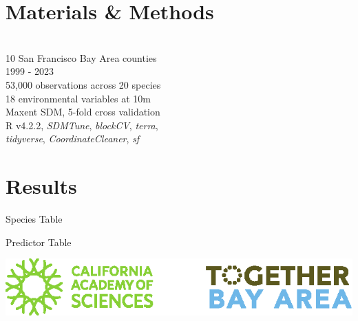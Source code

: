 \documentclass[a0paper,fleqn]{betterposter}
\begin{document}
{\section{Materials \& Methods}
\def\iconspace{3mm}
\vspace{-14mm}
\\\faMapO   \hspace{1cm} 10 San Francisco Bay Area counties
\vspace{\iconspace}
\\\faClockO \hspace{1cm} 1999 - 2023
\vspace{\iconspace}
\\\faMapMarker \hspace{1cm} 53,000 observations across 20 species
\vspace{\iconspace}
\\\faSunO \hspace{1cm} 18 environmental variables at 10m
\vspace{\iconspace}
\\\faConnectdevelop \hspace{1cm} Maxent SDM, 5-fold cross validation
\vspace{\iconspace}
\\\faCode \hspace{1cm} R v4.2.2, \textit{SDMTune}, \textit{blockCV}, \textit{terra}, 
\\ \hspace*{2.1cm} \textit{tidyverse}, \textit{CoordinateCleaner}, \textit{sf}
\begin{center}

\end{center}




}{
\section{Results}

Species Table

Predictor Table


\vfill

\begin{center}

\includegraphics[width=.8\textwidth]{img/combined_logo.eps}\\
\end{center}
}
\end{document}
